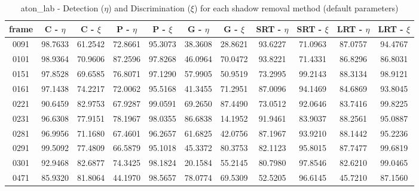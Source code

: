 \begin{appendices}
\begin{table}
\begin{tabular}{ |c|c|c|c|c|c|c|c|c|c|c| }
\hline
\end{tabular}

\end{table}

\begin{table}
\centering
\caption{aton\_lab - Detection ($\eta$) and Discrimination ($\xi$) for each shadow removal method (default parameters)}
\begin{tabular}{ |c|c|c|c|c|c|c|c|c|c|c| }
	\hline
\textbf{frame} &  \textbf{C - $\eta$} &  \textbf{C - $\xi$} &  \textbf{P - $\eta$} &  \textbf{P - $\xi$} &  \textbf{G - $\eta$} &  \textbf{G - $\xi$} &  \textbf{SRT - $\eta$} &  \textbf{SRT - $\xi$} &  \textbf{LRT - $\eta$} &  \textbf{LRT - $\xi$} \\
\hline
\hline
0091 &  98.7633 &  61.2542 &   72.8661 &  95.3073 &   38.3608 &  28.8621 &   93.6227 &  71.0963 &   87.0757 &  94.4767    \\
\hline
0101 &  98.9364 &  70.9606 &   87.2596 &  97.8268 &   46.0964 &  70.0472 &   93.8221 &  71.4331 &   86.8296 &  86.8031    \\
\hline
0151 &  97.8528 &  69.6585 &   76.8071 &  97.1290 &   57.9905 &  50.9519 &   73.2995 &  99.2143 &   88.3134 &  98.9121    \\
\hline
0161 &  97.1438 &  74.2217 &   72.0062 &  95.5168 &   41.3455 &  71.2951 &   87.0096 &  94.1469 &   84.6869 &  93.8045    \\
\hline
0221 &  90.6459 &  82.9753 &   67.9287 &  99.0591 &   69.2650 &  87.4490 &   73.0512 &  92.0646 &   83.7416 &  99.8225    \\
\hline
0231 &  96.6308 &  77.9151 &   78.1967 &  98.0355 &   86.6838 &  14.1952 &   91.9461 &  83.9037 &   88.2561 &  95.0887    \\
\hline
0281 &  96.9956 &  71.1680 &   67.4601 &  96.2657 &   61.6825 &  42.0756 &   87.1967 &  93.9210 &   88.1442 &  95.2236    \\
\hline
0291 &  99.5092 &  77.4809 &   66.5879 &  95.1018 &   45.3372 &  80.3753 &   82.1123 &  95.8015 &   87.7477 &  99.6819    \\
\hline
0301 &  92.9468 &  82.6877 &   74.3425 &  98.1824 &   20.1584 &  55.2145 &   80.7980 &  97.8546 &   82.6210 &  99.0465    \\
\hline
0471 &  85.9320 &  81.8064 &   44.1970 &  98.5657 &   78.0774 &  69.5309 &   52.5205 &  96.6145 &   45.7210 &  87.1560    \\

\end{tabular}
\end{table}
\end{appendices}

